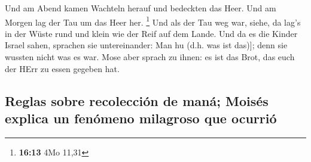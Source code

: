  Und am Abend kamen Wachteln herauf und bedeckten das
Heer. Und am Morgen lag der Tau um das Heer her. \footnote{\textbf{16:13}
  4Mo 11,31}  Und als der Tau weg war, siehe, da lag's in
der Wüste rund und klein wie der Reif auf dem Lande.  Und
da es die Kinder Israel sahen, sprachen sie untereinander: Man hu (d.h.
was ist das){]}; denn sie wussten nicht was es war. Mose aber sprach zu
ihnen: es ist das Brot, das euch der HErr zu essen gegeben hat.

\hypertarget{reglas-sobre-recolecciuxf3n-de-manuxe1-moisuxe9s-explica-un-fenuxf3meno-milagroso-que-ocurriuxf3}{%
\subsection{Reglas sobre recolección de maná; Moisés explica un fenómeno
milagroso que
ocurrió}\label{reglas-sobre-recolecciuxf3n-de-manuxe1-moisuxe9s-explica-un-fenuxf3meno-milagroso-que-ocurriuxf3}}

